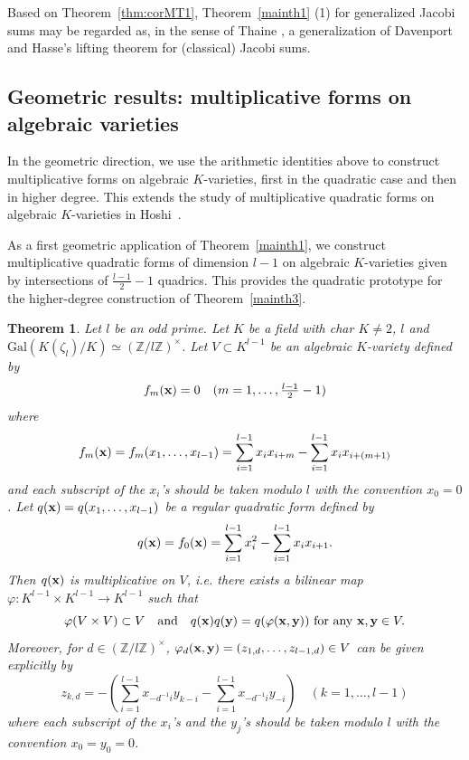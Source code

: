\documentclass[a4paper, 11pt]{amsart}
\newcommand{\Z}{\mathbb Z}
\newcommand{\Gal}{\mathrm{Gal}}
\theoremstyle{plain}
\newtheorem{thm}{Theorem}[section]
\theoremstyle{definition}
\numberwithin{equation}{section}
\begin{document}
Based on Theorem~\ref{thm:corMT1}, Theorem~\ref{mainth1} (1) for generalized Jacobi sums may be regarded as, in the sense of Thaine \cite{Tha04}, a generalization of Davenport and Hasse's lifting theorem for (classical) Jacobi sums.


\subsection{Geometric results: multiplicative forms on algebraic varieties}\label{S1-2}

In the geometric direction, we use the arithmetic identities above to construct multiplicative forms on algebraic $K$-varieties, first in the quadratic case and then in higher degree. 
This extends the study of multiplicative quadratic forms on algebraic $K$-varieties in Hoshi~\cite{Hos03}.

As a first geometric application of Theorem~\ref{mainth1}, we construct multiplicative quadratic forms of dimension $l-1$ on algebraic $K$-varieties given by intersections of $\frac{l-1}{2}-1$ quadrics.
This provides the quadratic prototype for the higher-degree construction of Theorem~\ref{mainth3}.

\begin{thm}\label{mainth2}
Let $l$ be an odd prime. 
Let $K$ be a field with char $K\neq 2$, $l$ and 
$\Gal(K(\zeta_l)/K)\simeq (\Z/l\Z)^{\times}$. 
Let $V \subset K^{l-1}$ be
an 
algebraic $K$-variety defined by
\begin{align*}
f_m({\bf x})=0\quad (m=1,\dots, \tfrac{l-1}{2}-1)
\end{align*}
where
\[
f_m({\bf x})=f_m(x_1,\ldots,x_{l-1})
=\sum_{i=1}^{l-1}x_ix_{i+m}-\sum_{i=1}^{l-1}x_ix_{i+(m+1)}
\]
and each subscript of the $x_{i}$'s should be taken modulo $l$ with the convention $x_0=0$.
Let $q({\bf x})=q(x_1,\ldots,x_{l-1})$ be a regular quadratic form defined by
\[
q({\bf x})=f_0({\bf x})
=\sum_{i=1}^{l-1}x_i^2-\sum_{i=1}^{l-1}x_ix_{i+1}.
\]
Then $q({\bf x})$ is multiplicative on $V$, 
i.e. there exists a bilinear map 
$\varphi :K^{l-1}\times K^{l-1} \rightarrow K^{l-1}$ such that
\[
\varphi(V \times V) \subset V \quad \mbox{and}\quad q({\bf x})q({\bf y})=q(\varphi({\bf x,y}))\mbox{ for any }{\bf x,y} \in V. 
\]
Moreover, for $d \in (\Z/l\Z)^{\times}$, $\varphi_d ({\bf x},{\bf y})=(z_{1,d},\ldots,z_{l-1,d}) \in V$ 
can be given explicitly by
\[
z_{k,d}=-\left(\sum_{i=1}^{l-1}x_{-d^{-1}i}y_{k-i} - \sum_{i=1}^{l-1}x_{-d^{-1}i}y_{-i}\right)\quad (k=1,\ldots,l-1)
\]
where each subscript of the $x_i$'s and the $y_j$'s should be taken modulo $l$ with the convention $x_0=y_0=0$.
\end{thm}
\end{document}
